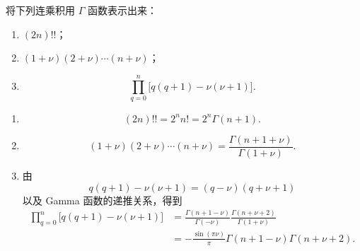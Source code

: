 
\begin{question}
将下列连乘积用 \(\Gamma\) 函数表示出来：
\begin{enumerate}
  \item \((2n)!!\)；
  \item \((1+\nu)(2+\nu)\dotsm(n+\nu)\)；
  \item
  \[
  \prod_{q=0}^{n}\bigl[q(q+1)-\nu(\nu+1)\bigr].
  \]
\end{enumerate}
\begin{solution}
\begin{enumerate}
  \item
  \[
  (2n)!!=2^n n!=2^n\Gamma(n+1).
  \]

  \item
  \[
  (1+\nu)(2+\nu)\dotsm(n+\nu)
  =\frac{\Gamma(n+1+\nu)}{\Gamma(1+\nu)}.
  \]

  \item 由
  \[
  q(q+1)-\nu(\nu+1)=(q-\nu)(q+\nu+1)
  \]
  以及 Gamma 函数的递推关系，得到
  \[
  \begin{aligned}
  \prod_{q=0}^{n}\bigl[q(q+1)-\nu(\nu+1)\bigr]
  &=
  \frac{\Gamma(n+1-\nu)}{\Gamma(-\nu)}
  \frac{\Gamma(n+\nu+2)}{\Gamma(1+\nu)}\\
  &=-\frac{\sin(\pi\nu)}{\pi}
  \Gamma(n+1-\nu)\Gamma(n+\nu+2).
  \end{aligned}
  \]
\end{enumerate}
\end{solution}
\end{question}

